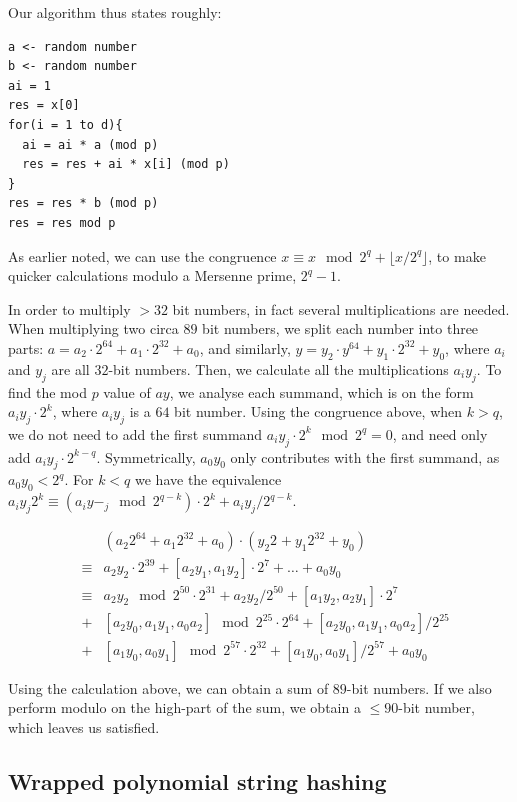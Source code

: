 \documentclass[]{article}
\begin{document}
Our algorithm thus states roughly:

\begin{verbatim}
a <- random number
b <- random number
ai = 1
res = x[0]
for(i = 1 to d){
  ai = ai * a (mod p)
  res = res + ai * x[i] (mod p)
}
res = res * b (mod p)
res = res mod p
\end{verbatim}

As earlier noted, we can use the congruence $x \equiv x\mod 2^q + \lfloor x / 2^q \rfloor$, to make quicker calculations modulo a Mersenne prime, $2^q -1$.

In order to multiply $>32$ bit numbers, in fact several multiplications are needed. When multiplying two circa $89$ bit numbers, we split each number into three parts: $a = a_2\cdot 2^{64} + a_1 \cdot 2^{32} + a_0$, and similarly, $y = y_2\cdot y^{64} + y_1 \cdot 2^{32} + y_0$, where $a_i$ and $y_j$ are all $32$-bit numbers. Then, we calculate all the multiplications $a_i y_j$. To find the mod $p$ value of $ay$, we analyse each summand, which is on the form $a_i y_j \cdot 2^{k}$, where $a_i y_j$ is a $64$ bit number. Using the congruence above, when $k>q$, we do not need to add the first summand $a_i y_j \cdot 2^k \mod 2^q = 0$, and need only add $a_i y_j \cdot 2^{k-q}$. Symmetrically, $a_0 y_0$ only contributes with the first summand, as $a_0 y_0 < 2^q$. For $k<q$ we have the equivalence $a_i y_j 2^k \equiv (a_i y-_j \mod 2^{q-k})\cdot 2^k + a_i y_j / 2^{q-k}$.

\[\begin{matrix}
& & (a_2 2^{64} + a_1 2^{32} + a_0)\cdot (y_2 2^{} + y_1 2^{32} + y_0) \\
& \equiv & a_2 y_2 \cdot 2^{39} + [a_2 y_1,a_1 y_2] \cdot 2^7 + \ldots + a_0 y_0 \\
& \equiv & a_2 y_2 \mod 2^{50} \cdot 2^{31} + a_2 y_2 / 2^{50} + [a_1 y_2, a_2 y_1] \cdot 2^7 \\
& + & [a_2 y_0, a_1 y_1, a_0 a_2] \mod 2^{25} \cdot 2^{64} + [a_2 y_0, a_1 y_1, a_0 a_2] /2^{25} \\
& + & [a_1 y_0, a_0 y_1] \mod 2^{57} \cdot 2^{32} + [a_1 y_0, a_0 y_1] /2^{57} + a_0 y_0
\end{matrix}
\]

Using the calculation above, we can obtain a sum of $89$-bit numbers. If we also perform modulo on the high-part of the sum, we obtain a $\le 90$-bit number, which leaves us satisfied.

\subsection*{Wrapped polynomial string hashing}
\end{document}
